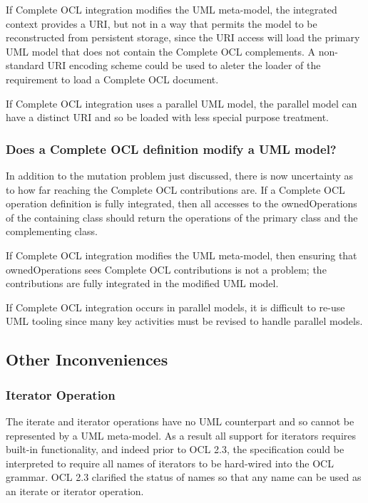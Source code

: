 \documentclass{eceasst}
\begin{document}
If Complete OCL integration modifies the UML meta-model, the integrated context provides a URI, but not in a way that permits the model to be reconstructed from persistent storage, since the URI access will load the primary UML model that does not contain the Complete OCL complements. A non-standard URI encoding scheme could be used to aleter the loader of the requirement to load a Complete OCL document.

If Complete OCL integration uses a parallel UML model, the parallel model can have a distinct URI and so be loaded with less special purpose treatment.

\subsubsection{Does a Complete OCL definition modify a UML model?}

In addition to the mutation problem just discussed, there is now uncertainty as to how far reaching the Complete OCL contributions are. If a Complete OCL operation definition is fully integrated, then all accesses to the ownedOperations of the containing class should return the operations of the primary class and the complementing class.

If Complete OCL integration modifies the UML meta-model, then ensuring that ownedOperations sees Complete OCL contributions is not a problem; the contributions are fully integrated in the modified UML model.

If Complete OCL integration occurs in parallel models, it is difficult to re-use UML tooling since many key activities must be revised to handle parallel models.


\subsection{Other Inconveniences}

\subsubsection{Iterator Operation}

The iterate and iterator operations have no UML counterpart and so cannot be represented by a UML meta-model. As a result all support for iterators requires built-in functionality, and indeed prior to OCL 2.3, the specification could be interpreted to require all names of iterators to be hard-wired into the OCL grammar. OCL 2.3 clarified the status of names so that any name can be used as an iterate or iterator operation.
\end{document}

